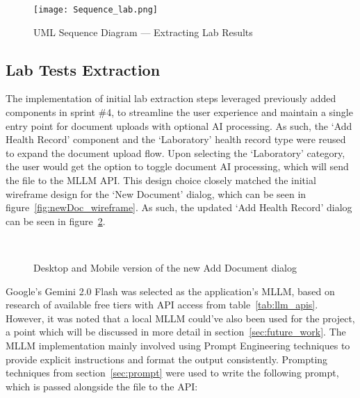 \begin{figure}[htbp]
  \centering
  \texttt{[image: Sequence\_lab.png]}
  \caption{UML Sequence Diagram --- Extracting Lab Results}\label{fig:sequence_lab}
\end{figure}

\subsection{Lab Tests Extraction}

The implementation of initial lab extraction steps leveraged previously added components in sprint \#4, to streamline the user experience and maintain a single entry point for document uploads with optional AI processing. As such, the `Add Health Record' component and the `Laboratory' health record type were reused to expand the document upload flow. Upon selecting the `Laboratory' category, the user would get the option to toggle document AI processing, which will send the file to the MLLM API\@. This design choice closely matched the initial wireframe design for the `New Document' dialog, which can be seen in figure~\ref{fig:newDoc_wireframe}. As such, the updated `Add Health Record' dialog can be seen in figure~\ref{fig:labs_addDoc}.

\begin{figure}[ht]
  \centering
  \\[\baselineskip]
  \caption{Desktop and Mobile version of the new Add Document dialog}\label{fig:labs_addDoc}
\end{figure}

\FloatBarrier{}

Google's Gemini 2.0 Flash was selected as the application's MLLM, based on research of available free tiers with API access from table~\ref{tab:llm_apis}. However, it was noted that a local MLLM could've also been used for the project, a point which will be discussed in more detail in section~\ref{sec:future_work}. The MLLM implementation mainly involved using Prompt Engineering techniques to provide explicit instructions and format the output consistently. Prompting techniques from section~\ref{sec:prompt} were used to write the following prompt, which is passed alongside the file to the API:

